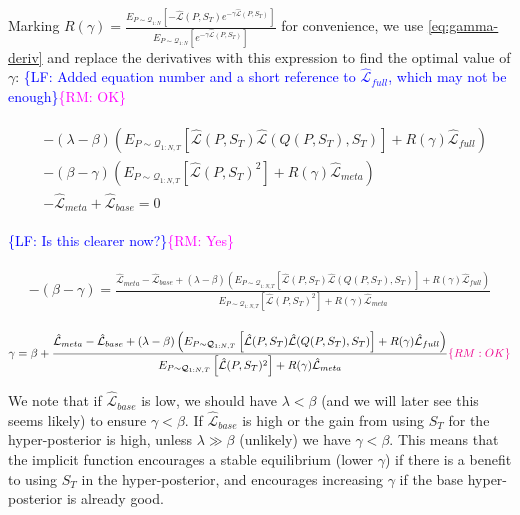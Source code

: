 \documentclass[letterpaper]{article}
\theoremstyle{definition}
\newcommand{\RM}[1]{\textcolor{magenta}{\{RM: #1\}}}
\newcommand{\LF}[1]{\textcolor{blue}{\{LF: #1\}}}
\begin{document}
Marking $R(\gamma)=\frac{E_{P\sim \mathcal{Q}_{1:N}}\left[-\hat{\mathcal{L}}(P,S_T)e^{-\gamma\hat{\mathcal{L}}(P,S_T)} \right]}{E_{P\sim \mathcal{Q}_{1:N}}\left[e^{-\gamma\hat{\mathcal{L}}(P,S_T)} \right]}$ for convenience, we use \eqref{eq:gamma-deriv} and replace the derivatives with this expression to find the optimal value of $\gamma$: 
\LF{Added equation number and a short reference to $\hat{\mathcal{L}}_{full}$, which may not be enough}\RM{OK}

\begin{align*} 
\begin{split}
&-(\lambda-\beta)\left (E_{P\sim \mathcal{Q}_{1:N,T}}\left [\hat{\mathcal{L}}(P,S_T)\hat{\mathcal{L}}\left (Q(P,S_T),S_T\right )\right]+R(\gamma)\hat{\mathcal{L}}_{full}\right )\\& - (\beta-\gamma)\left (E_{P\sim \mathcal{Q}_{1:N,T}}\left [\hat{\mathcal{L}}(P,S_T)^2\right]+R(\gamma)\hat{\mathcal{L}}_{meta}\right )\\& - \hat{\mathcal{L}}_{meta}+\hat{\mathcal{L}}_{base} = 0
\end{split}
\end{align*}

\LF{Is this clearer now?}\RM{Yes}

\begin{align*} 
\begin{split}
 -(\beta-\gamma) = \frac{\hat{\mathcal{L}}_{meta}-\hat{\mathcal{L}}_{base}+(\lambda-\beta)\left (E_{P\sim \mathcal{Q}_{1:N,T}}\left [\hat{\mathcal{L}}(P,S_T)\hat{\mathcal{L}}(Q(P,S_T),S_T)\right]+R(\gamma)\hat{\mathcal{L}}_{full}\right )}{E_{P\sim \mathcal{Q}_{1:N,T}}\left [\hat{\mathcal{L}}(P,S_T)^2\right]+R(\gamma)\hat{\mathcal{L}}_{meta}}
\end{split}
\end{align*}

\begin{align} \label{eq:meta-pb-gamma}
\begin{split}
\gamma = \beta+\frac{\hat{\mathcal{L}}_{meta}-\hat{\mathcal{L}}_{base}+(\lambda-\beta)\left (E_{P\sim \mathcal{Q}_{1:N,T}}\left [\hat{\mathcal{L}}(P,S_T)\hat{\mathcal{L}}(Q(P,S_T),S_T)\right]+R(\gamma)\hat{\mathcal{L}}_{full}\right )}{E_{P\sim \mathcal{Q}_{1:N,T}}\left [\hat{\mathcal{L}}(P,S_T)^2\right]+R(\gamma)\hat{\mathcal{L}}_{meta}}
\end{split}\hfill\RM{OK}
\end{align}

We note that if $\hat{\mathcal{L}}_{base}$ is low, we should have $\lambda < \beta$ (and we will later see this seems likely) to ensure $\gamma < \beta$. If $\hat{\mathcal{L}}_{base}$ is high or the gain from using $S_T$ for the hyper-posterior is high, unless $\lambda \gg \beta$ (unlikely) we have $\gamma < \beta$. This means that the implicit function encourages a stable equilibrium (lower $\gamma$) if there is a benefit to using $S_T$ in the hyper-posterior, and encourages increasing $\gamma$ if the base hyper-posterior is already good.
\end{document}
